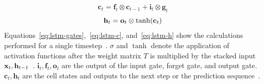 \begin{equation}\label{eq:lstm-c}
    \textbf{c}_t=\textbf{f}_t\otimes\textbf{c}_{t-1} + \textbf{i}_t\otimes\textbf{g}_t
\end{equation}
\begin{equation}\label{eq:lstm-h}
    \textbf{h}_t=\textbf{o}_t\otimes\tanh(\textbf{c}_t)
\end{equation}
Equations~\ref{eq:lstm-gates},~\ref{eq:lstm-c}, and~\ref{eq:lstm-h} show the calculations
performed for a single timestep~\citep{xu_show_2016}.
$\sigma$ and $\tanh$ denote the application of activation functions after the weight matrix $T$
is multiplied by the stacked input $\textbf{x}_t,\textbf{h}_{t-1}$~\citep{zaremba_recurrent_2015}.
$\textbf{i}_t,\textbf{f}_t,\textbf{o}_t$ are the output of the input gate, forget gate, and output
gate.
$\textbf{c}_t,\textbf{h}_t$ are the cell states and outputs to the next step or the
prediction sequence~\citep{zaremba_recurrent_2015}.

